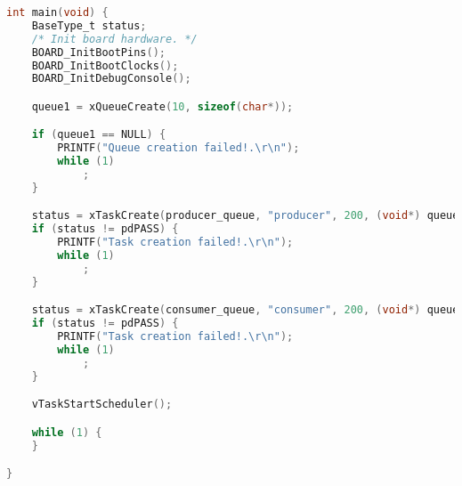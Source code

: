 \begin{lstlisting}[language=c,caption=Problem 2 main, label=list:p2_main]
int main(void) {
    BaseType_t status;
    /* Init board hardware. */
    BOARD_InitBootPins();
    BOARD_InitBootClocks();
    BOARD_InitDebugConsole();

    queue1 = xQueueCreate(10, sizeof(char*));

    if (queue1 == NULL) {
        PRINTF("Queue creation failed!.\r\n");
        while (1)
            ;
    }

    status = xTaskCreate(producer_queue, "producer", 200, (void*) queue1, 2, NULL);
    if (status != pdPASS) {
        PRINTF("Task creation failed!.\r\n");
        while (1)
            ;
    }

    status = xTaskCreate(consumer_queue, "consumer", 200, (void*) queue1, 3, NULL);
    if (status != pdPASS) {
        PRINTF("Task creation failed!.\r\n");
        while (1)
            ;
    }

    vTaskStartScheduler();

    while (1) {
    }

}
\end{lstlisting}
